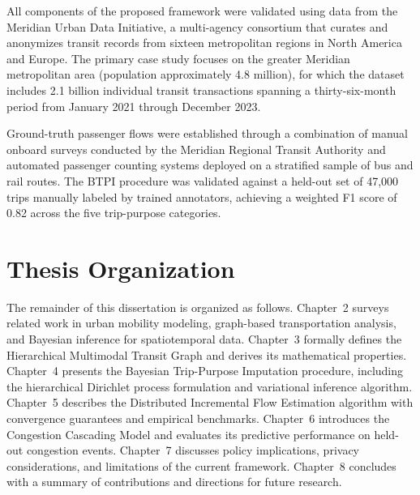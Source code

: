 \documentclass[12pt,letterpaper,twoside]{report}
\begin{document}
All components of the proposed framework were validated using data from the Meridian Urban Data Initiative, a multi-agency consortium that curates and anonymizes transit records from sixteen metropolitan regions in North America and Europe. The primary case study focuses on the greater Meridian metropolitan area (population approximately 4.8 million), for which the dataset includes 2.1 billion individual transit transactions spanning a thirty-six-month period from January 2021 through December 2023.

Ground-truth passenger flows were established through a combination of manual onboard surveys conducted by the Meridian Regional Transit Authority and automated passenger counting systems deployed on a stratified sample of bus and rail routes. The BTPI procedure was validated against a held-out set of 47,000 trips manually labeled by trained annotators, achieving a weighted F1 score of 0.82 across the five trip-purpose categories.

\section{Thesis Organization}

The remainder of this dissertation is organized as follows. Chapter~2 surveys related work in urban mobility modeling, graph-based transportation analysis, and Bayesian inference for spatiotemporal data. Chapter~3 formally defines the Hierarchical Multimodal Transit Graph and derives its mathematical properties. Chapter~4 presents the Bayesian Trip-Purpose Imputation procedure, including the hierarchical Dirichlet process formulation and variational inference algorithm. Chapter~5 describes the Distributed Incremental Flow Estimation algorithm with convergence guarantees and empirical benchmarks. Chapter~6 introduces the Congestion Cascading Model and evaluates its predictive performance on held-out congestion events. Chapter~7 discusses policy implications, privacy considerations, and limitations of the current framework. Chapter~8 concludes with a summary of contributions and directions for future research.
\end{document}
